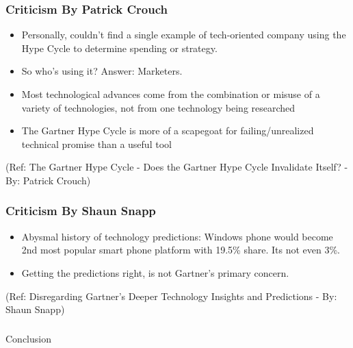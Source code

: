 \begin{frame}[fragile]\frametitle{Criticism By Patrick Crouch}


\begin{itemize}
\item Personally, couldn’t find a single example of tech-oriented company using the Hype Cycle to determine spending or strategy.
\item So who’s using it? Answer: Marketers.
\item Most technological advances come from the combination or misuse of a variety of technologies, not from one technology being researched
\item The Gartner Hype Cycle is more of a scapegoat for failing/unrealized technical promise than a useful tool

\end{itemize}

{\tiny (Ref: The Gartner Hype Cycle - Does the Gartner Hype Cycle Invalidate Itself? - By: Patrick Crouch)}

\end{frame}

\begin{frame}[fragile]\frametitle{Criticism By Shaun Snapp}


\begin{itemize}
\item Abysmal history of technology predictions: Windows phone would become 2nd most popular smart phone platform with 19.5\% share. Its not even 3\%.
\item Getting the predictions right, is not Gartner's primary concern.

\end{itemize}

{\tiny (Ref: Disregarding Gartner's Deeper Technology Insights and Predictions - By: Shaun Snapp)}

\end{frame}



\begin{frame}[fragile]\frametitle{}
\begin{center}
{\Large Conclusion}
\end{center}
\end{frame}

